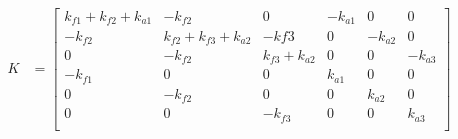 \documentclass[12pt]{article}
\begin{document}
\begin{math}
\begin{aligned}
K &= 
\begin{bmatrix} 
 k_{f1} + k_{f2} +  k_{a1} & -k_{f2} & 0 & -k_{a1} & 0 & 0 \\
 -k_{f2} & k_{f2} + k_{f3} + k_{a2} & -k{f3} & 0 & -k_{a2} & 0 \\
 0 & -k_{f2} & k_{f3} + k_{a2} & 0 & 0 & -k_{a3} \\
 -k_{f1} & 0 & 0 & k_{a1} & 0 & 0 \\
 0 & -k_{f2} & 0 & 0 & k_{a2} & 0 \\
 0 & 0 & -k_{f3} & 0 & 0 & k_{a3} \\
\end{bmatrix} \\
\end{aligned}
\end{math}
\end{document}

